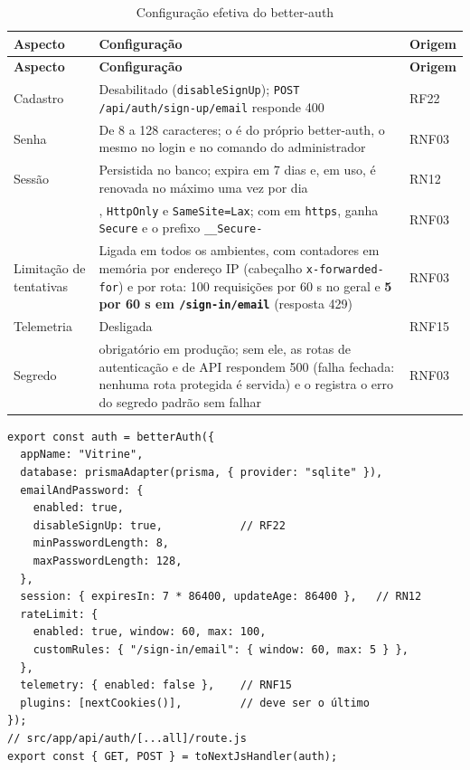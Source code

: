 \begingroup\small
\begin{longtable}{@{}L{3.0cm}L{9.6cm}L{1.9cm}@{}}
\caption{Configuração efetiva do better-auth}\label{tab:auth-config}\\
\toprule
\textbf{Aspecto} & \textbf{Configuração} & \textbf{Origem}\\
\midrule
\endfirsthead
\toprule
\textbf{Aspecto} & \textbf{Configuração} & \textbf{Origem}\\
\midrule
\endhead
\bottomrule
\endfoot
Cadastro & Desabilitado (\texttt{disableSignUp}); \texttt{POST /api/auth/sign-up/email} responde 400 & RF22\\
\addlinespace
Senha & De 8 a 128 caracteres; o  é do próprio better-auth, o mesmo no login e no comando do administrador & RNF03\\
\addlinespace
Sessão & Persistida no banco; expira em 7 dias e, em uso, é renovada no máximo uma vez por dia & RN12\\
\addlinespace
{} & , \texttt{HttpOnly} e \texttt{SameSite=Lax}; com  em \texttt{https}, ganha \texttt{Secure} e o prefixo \texttt{\_\_Secure-} & RNF03\\
\addlinespace
Limitação de tentativas & Ligada em todos os ambientes, com contadores em memória por endereço IP (cabeçalho \texttt{x-forwarded-for}) e por rota: 100 requisições por 60 s no geral e \textbf{5 por 60 s em \texttt{/sign-in/email}} (resposta 429) & RNF03\\
\addlinespace
Telemetria & Desligada & RNF15\\
\addlinespace
Segredo &  obrigatório em produção; sem ele, as rotas de autenticação e de API respondem 500 (falha fechada: nenhuma rota protegida é servida) e o  registra o erro do segredo padrão sem falhar & RNF03\\
\end{longtable}
\endgroup

\begin{lstlisting}[language=VJS, caption={Configuração efetiva do servidor de autenticação (resumo de src/lib/auth.js)}, label={lst:auth-esboco}]
export const auth = betterAuth({
  appName: "Vitrine",
  database: prismaAdapter(prisma, { provider: "sqlite" }),
  emailAndPassword: {
    enabled: true,
    disableSignUp: true,            // RF22
    minPasswordLength: 8,
    maxPasswordLength: 128,
  },
  session: { expiresIn: 7 * 86400, updateAge: 86400 },   // RN12
  rateLimit: {
    enabled: true, window: 60, max: 100,
    customRules: { "/sign-in/email": { window: 60, max: 5 } },
  },
  telemetry: { enabled: false },    // RNF15
  plugins: [nextCookies()],         // deve ser o último
});
// src/app/api/auth/[...all]/route.js
export const { GET, POST } = toNextJsHandler(auth);
\end{lstlisting}

